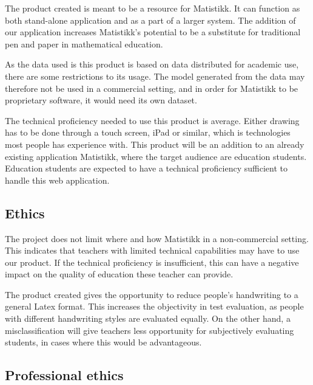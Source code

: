 
% 

The product created is meant to be a resource for Matistikk. It can function as both stand-alone application and as a part of a larger system. The addition of our application increases Matistikk's potential to be a substitute for traditional pen and paper in mathematical education.

As the data used is this product is based on data distributed for academic use, there are some restrictions to its usage. The model generated from the data may therefore not be used in a commercial setting, and in order for Matistikk to be proprietary software, it would need its own dataset.

The technical proficiency needed to use this product is average. Either drawing has to be done through a touch screen, iPad or similar, which is technologies most people has experience with. This product will be an addition to an already existing application Matistikk, where the target audience are education students. Education students are expected to have a technical proficiency sufficient to handle this web application.

\subsection{Ethics}

The project does not limit where and how Matistikk in a non-commercial setting. This indicates that teachers with limited technical capabilities may have to use our product. If the technical proficiency is insufficient, this can have a negative impact on the quality of education these teacher can provide. 

The product created gives the opportunity to reduce people's handwriting to a general Latex format. This increases the objectivity in test evaluation, as people with different handwriting styles are evaluated equally. On the other hand, a misclassification will give teachers less opportunity for subjectively evaluating students, in cases where this would be advantageous.

\subsection{Professional ethics}

